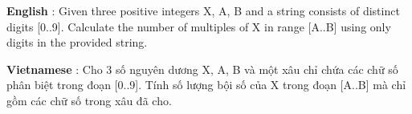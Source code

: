 \textbf{    English   }   : Given three positive integers X, A, B and a string consists of distinct digits [0..9]. Calculate the number of multiples of X in range [A..B] using only digits in the provided string.  

\textbf{    Vietnamese   }   : Cho 3 số nguyên dương X, A, B và một xâu chỉ chứa các chữ số phân biệt trong đoạn [0..9]. Tính số lượng bội số của X trong đoạn [A..B] mà chỉ gồm các chữ số trong xâu đã cho.